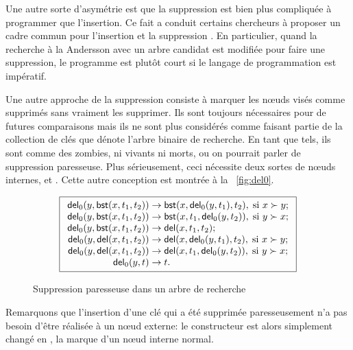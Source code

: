 Une autre sorte d'asymétrie est que la suppression est bien plus
compliquée à programmer que l'insertion. Ce fait a conduit certains
chercheurs à proposer un cadre commun pour l'insertion et la
suppression \citep{Andersson_1991,Hinze_2002}. En particulier, quand
la recherche à la Andersson avec un arbre candidat est modifiée pour
faire une suppression, le programme est plutôt court si le langage de
programmation est impératif.

Une autre approche de la suppression consiste à marquer les nœuds
visés comme supprimés sans vraiment les supprimer. Ils sont toujours
nécessaires pour de futures comparaisons mais ils ne sont plus
considérés comme faisant partie de la collection de clés que dénote
l'arbre binaire de recherche. En tant que tels, ils sont comme des
zombies, ni vivants ni morts, ou on pourrait parler de suppression
paresseuse. Plus sérieusement, ceci nécessite deux sortes de nœuds
internes,  et . Cette
autre conception est montrée à la \fig~\vref{fig:del0}.
\begin{figure}
\begin{equation*}
\boxed{
\begin{array}{r@{\;}l@{\;}l}
  \fun{del}_0(y,\fun{bst}(x,t_1,t_2)) & \rightarrow &
  \fun{bst}(x,\fun{del}_0(y,t_1),t_2),\; \text{si \(x \succ y\)};\\
\fun{del}_0(y,\fun{bst}(x,t_1,t_2)) & \rightarrow &
  \fun{bst}(x,t_1,\fun{del}_0(y,t_2)),\; \text{si \(y \succ x\)};\\
\fun{del}_0(y,\fun{bst}(x,t_1,t_2)) & \rightarrow &
  \fun{del}(x,t_1,t_2);\\
\fun{del}_0(y,\fun{del}(x,t_1,t_2)) & \rightarrow &
  \fun{del}(x,\fun{del}_0(y,t_1),t_2),\; \text{si \(x \succ y\)};\\
\fun{del}_0(y,\fun{del}(x,t_1,t_2)) & \rightarrow &
  \fun{del}(x,t_1,\fun{del}_0(y,t_2)),\; \text{si \(y \succ x\)};\\
\fun{del}_0(y,t) & \rightarrow & t.\\
\end{array}}
\end{equation*}
\caption{Suppression paresseuse dans un arbre de recherche}
\label{fig:del0}
\end{figure}
Remarquons que l'insertion d'une clé qui a été supprimée
paresseusement n'a pas besoin d'être réalisée à un nœud externe:
le constructeur  est alors simplement changé en
, la marque d'un nœud interne normal.

